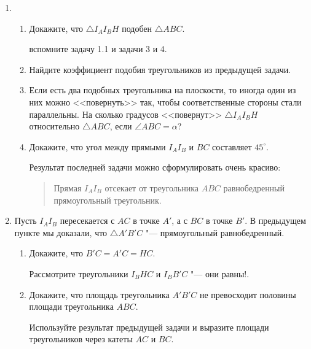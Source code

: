 \documentclass[12pt]{article}
\begin{document}
\begin{enumerate}[\bf 1.]
\begin{enumerate}[1.]
\end{enumerate}


\item

\begin{enumerate}[1.]
    \item  Докажите, что $\triangle I_A I_B H$ подобен $\triangle ABC$.
    \begin{leftbar}
    вспомните задачу 1.1 и задачи 3 и 4.
    \end{leftbar}
    
    \item Найдите коэффициент подобия треугольников из предыдущей задачи.
    \item Если есть два подобных треугольника на плоскости, то иногда один из них можно <<повернуть>> так, чтобы соответственные стороны стали параллельны. На сколько градусов <<повернут>> $\triangle I_A I_B H$ относительно $\triangle ABC$, если $\angle ABC = \alpha$?
    \item Докажите, что угол между прямыми $I_AI_B$ и $BC$ составляет $45^\circ$.

            \medskip

    Результат последней задачи можно сформулировать очень красиво:
    \begin{quote}
        Прямая $I_AI_B$ отсекает от треугольника $ABC$ равнобедренный прямоугольный треугольник.
    \end{quote}
\end{enumerate}

\item
Пусть $I_AI_B$ пересекается с $AC$ в точке $A'$, а с $BC$  в точке $B'$. В предыдущем пункте мы доказали, что $\triangle A'B'C$ "--- прямоугольный равнобедренный.
\begin{enumerate}
    \item 
    Докажите, что $B'C = A'C = HC$.
    \begin{leftbar}
    Рассмотрите треугольники $I_B H C$ и $I_B B' C$ "--- они равны!. 
    \end{leftbar}
    \item 
    Докажите, что площадь треугольника $A'B'C$ не превосходит половины площади треугольника $ABC$.
    \begin{leftbar}
    Используйте результат предыдущей задачи и выразите площади треугольников через катеты $AC$ и $BC$.
    \end{leftbar}
\end{enumerate}
\end{enumerate}
\end{document}
